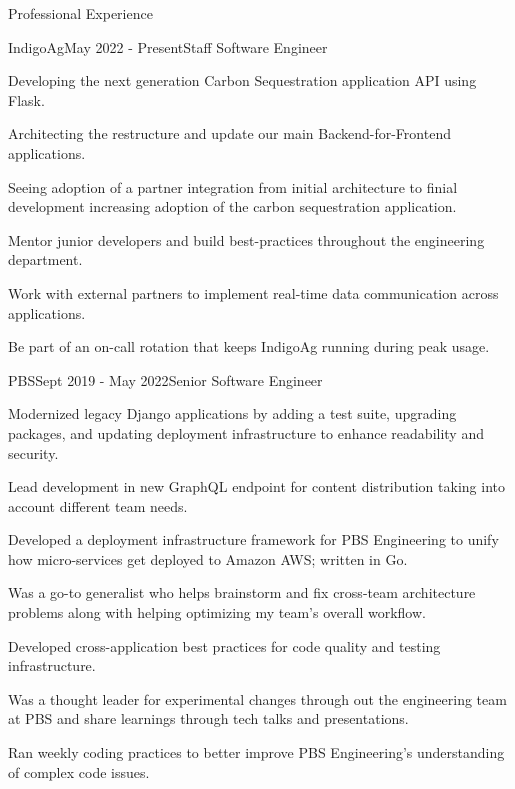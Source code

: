 \documentclass{bluefin_cv}
\begin{document}
\begin{bfcvSection}{Professional Experience}

\begin{bfcvWorkSubsection}{IndigoAg}{May 2022 - Present}{Staff Software Engineer}
\item Developing the next generation Carbon Sequestration application API using Flask.
\item Architecting the restructure and update our main Backend-for-Frontend applications.
\item Seeing adoption of a partner integration from initial architecture to finial development increasing adoption of the carbon sequestration application.
\item Mentor junior developers and build best-practices throughout the engineering department.
\item Work with external partners to implement real-time data communication across applications.
\item Be part of an on-call rotation that keeps IndigoAg running during peak usage.
\end{bfcvWorkSubsection}

\begin{bfcvWorkSubsection}{PBS}{Sept 2019 - May 2022}{Senior Software Engineer}
\item Modernized legacy Django applications by adding a test suite, upgrading packages, and updating deployment infrastructure to enhance readability and security.
\item Lead development in new GraphQL endpoint for content distribution taking into account different team needs.
\item Developed a deployment infrastructure framework for PBS Engineering to unify how micro-services get deployed to Amazon AWS; written in Go.
\item Was a go-to generalist who helps brainstorm and fix cross-team architecture problems along with helping optimizing my team's overall workflow.
\item Developed cross-application best practices for code quality and testing infrastructure.
\item Was a thought leader for experimental changes through out the engineering team at PBS and share learnings through tech talks and presentations.
\item Ran weekly coding practices to better improve PBS Engineering's understanding of complex code issues.
\end{bfcvWorkSubsection}


\end{bfcvSection}
\end{document}

